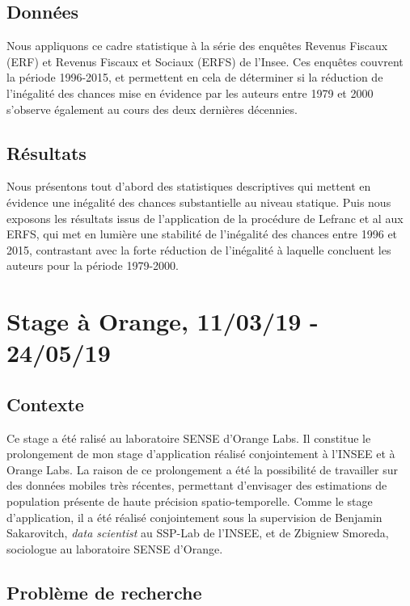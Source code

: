\documentclass[12pt]{article}
\begin{document}
\subsection{Données}

Nous appliquons ce cadre statistique à la série des enquêtes Revenus Fiscaux (ERF) et Revenus Fiscaux et Sociaux (ERFS) de l'Insee. Ces enquêtes couvrent la période 1996-2015, et permettent en cela de déterminer si la réduction de l'inégalité des chances mise en évidence par les auteurs entre 1979 et 2000 s'observe également au cours des deux dernières décennies.

\subsection{Résultats}

Nous présentons tout d'abord des statistiques descriptives qui mettent en évidence une inégalité des chances substantielle au niveau statique. Puis nous exposons les résultats issus de l'application de la procédure de Lefranc et al aux ERFS, qui met en lumière une stabilité de l'inégalité des chances entre 1996 et 2015, contrastant avec la forte réduction de l'inégalité à laquelle concluent les auteurs pour la période 1979-2000.

\section{Stage à Orange, 11/03/19 - 24/05/19}

\subsection{Contexte}

Ce stage a été ralisé au laboratoire SENSE d'Orange Labs. Il constitue le prolongement de mon stage d'application réalisé conjointement à l'INSEE et à Orange Labs. La raison de ce prolongement a été la possibilité de travailler sur des données mobiles très récentes, permettant d'envisager des estimations de population présente de haute précision spatio-temporelle. Comme le stage d'application, il a été réalisé conjointement sous la supervision de Benjamin Sakarovitch, \textit{data scientist} au SSP-Lab de l'INSEE, et de Zbigniew Smoreda, sociologue au laboratoire SENSE d'Orange.

\subsection{Problème de recherche}
\end{document}
